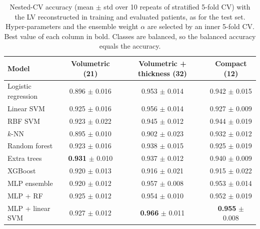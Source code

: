 \begin{table}[!htb]
\centering
\small
\setlength{\tabcolsep}{5pt}
\begin{tabular}{lccc}
\toprule
Model & Volumetric (21) & Volumetric + thickness (32) & Compact (12)\\
\midrule
Logistic regression & 0.896 $\pm$ 0.016 & 0.953 $\pm$ 0.014 & 0.942 $\pm$ 0.015\\
Linear SVM & 0.925 $\pm$ 0.016 & 0.956 $\pm$ 0.014 & 0.927 $\pm$ 0.009\\
RBF SVM & 0.923 $\pm$ 0.022 & 0.945 $\pm$ 0.012 & 0.944 $\pm$ 0.019\\
$k$-NN & 0.895 $\pm$ 0.010 & 0.902 $\pm$ 0.023 & 0.932 $\pm$ 0.012\\
\midrule
Random forest & 0.923 $\pm$ 0.016 & 0.938 $\pm$ 0.015 & 0.925 $\pm$ 0.019\\
Extra trees & \textbf{0.931} $\pm$ 0.010 & 0.937 $\pm$ 0.012 & 0.940 $\pm$ 0.009\\
XGBoost & 0.920 $\pm$ 0.013 & 0.916 $\pm$ 0.021 & 0.915 $\pm$ 0.022\\
\midrule
MLP ensemble & 0.920 $\pm$ 0.012 & 0.957 $\pm$ 0.008 & 0.953 $\pm$ 0.014\\
MLP + RF & 0.925 $\pm$ 0.012 & 0.954 $\pm$ 0.010 & 0.952 $\pm$ 0.019\\
MLP + linear SVM & 0.927 $\pm$ 0.012 & \textbf{0.966} $\pm$ 0.011 & \textbf{0.955} $\pm$ 0.008\\
\bottomrule
\end{tabular}
\caption{Nested-CV accuracy (mean $\pm$ std over 10 repeats of stratified 5-fold CV) with the LV reconstructed in
training and evaluated patients, as for the test set. Hyper-parameters and the ensemble weight $\alpha$ are
selected by an inner 5-fold CV. Best value of each column in bold. Classes are balanced, so the balanced accuracy
equals the accuracy.}
\label{tab:benchmark}
\end{table}
